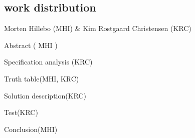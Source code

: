 \subsection{work distribution}
Morten Hillebo (MHI) & Kim Rostgaard Christensen (KRC)
\begin{itemise}
\item Abstract ( MHI )
\item Specification analysis (KRC)
\item Truth table(MHI, KRC)
\item Solution description(KRC)
\item Test(KRC)
\item Conclusion(MHI)
\end{itemise}

